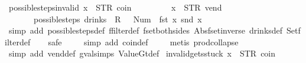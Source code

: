 \begin{isabellebody}
\isamarkupfalse%
%
\endisatagproof
{\isafoldproof}%
%
\isadelimproof
\isanewline
%
\endisadelimproof
\isanewline
{}\isamarkupfalse%
\ possible{\isacharunderscore}steps{\isacharunderscore}{}{\isacharunderscore}invalid{\isacharcolon}\ {\isachardoublequoteopen}x{}\ {\isasymnoteq}\ {\isacharparenleft}STR\ {\isacharprime}{\isacharprime}coin{\isacharprime}{\isacharprime}{\isacharcomma}\ {\isacharbrackleft}{\isacharbrackright}{\isacharparenright}\ {\isasymLongrightarrow}\isanewline
\ \ \ \ \ \ \ x{}\ {\isasymnoteq}\ {\isacharparenleft}STR\ {\isacharprime}{\isacharprime}vend{\isacharprime}{\isacharprime}{\isacharcomma}\ {\isacharbrackleft}{\isacharbrackright}{\isacharparenright}\ {\isasymLongrightarrow}\isanewline
\ \ \ \ \ \ \ possible{\isacharunderscore}steps\ drinks\ {}\ {\isacharless}R\ {}\ {\isacharcolon}{\isacharequal}\ Num\ {}{\isachargreater}\ {\isacharparenleft}fst\ x{}{\isacharparenright}\ {\isacharparenleft}snd\ x{}{\isacharparenright}\ {\isacharequal}\ {\isacharbraceleft}{\isacharbar}{\isacharbar}{\isacharbraceright}{\isachardoublequoteclose}\isanewline
%
\isadelimproof
\ \ %
\endisadelimproof
%
\isatagproof
{}\isamarkupfalse%
\ {\isacharparenleft}simp\ add{\isacharcolon}\ possible{\isacharunderscore}steps{\isacharunderscore}def\ ffilter{\isacharunderscore}def\ fset{\isacharunderscore}both{\isacharunderscore}sides\ Abs{\isacharunderscore}fset{\isacharunderscore}inverse\ drinks{\isacharunderscore}def\ Set{\isachardot}filter{\isacharunderscore}def{\isacharparenright}\isanewline
\ \ \isamarkupfalse%
\ safe\isanewline
\ \ \ \isamarkupfalse%
\ {\isacharparenleft}simp\ add{\isacharcolon}\ coin{\isacharunderscore}def{\isacharparenright}\isanewline
\ \ \ \isamarkupfalse%
\ {\isacharparenleft}metis\ prod{\isachardot}collapse{\isacharparenright}\isanewline
\ \ \isamarkupfalse%
\ {\isacharparenleft}simp\ add{\isacharcolon}\ vend{\isacharunderscore}def\ gval{\isachardot}simps\ ValueGt{\isacharunderscore}def{\isacharparenright}%
\endisatagproof
{\isafoldproof}%
%
\isadelimproof
\isanewline
%
\endisadelimproof
\isanewline
{}\isamarkupfalse%
\ invalid{\isacharunderscore}gets{\isacharunderscore}stuck{\isacharcolon}\ {\isachardoublequoteopen}x{}\ {\isasymnoteq}\ {\isacharparenleft}STR\ {\isacharprime}{\isacharprime}coin{\isacharprime}{\isacharprime}{\isacharcomma}\ {\isacharbrackleft}{\isacharbrackright}{\isacharparenright}\ {\isasymLongrightarrow}\isanewline

\end{isabellebody}
